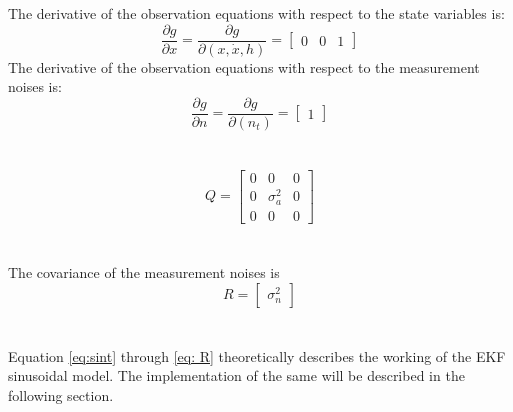 \documentclass[12pt]{article}
\begin{document}
The derivative of the observation equations with respect to the state variables is:
\begin{equation}
\frac{\partial g}{\partial x} =
\frac{\partial g}{\partial (x,\dot{x},h)} =
\begin{bmatrix}
0 & 0 & 1
\end{bmatrix}
\label{eq: Dgx}
\end{equation}
The derivative of the observation equations with respect to the measurement noises is:
\begin{equation}
\frac{\partial g}{\partial n} =
\frac{\partial g}{\partial (n_t)} =
\begin{bmatrix}
1 
\end{bmatrix}
\label{eq: Dgn}
\end{equation} \\
\\
\begin{equation}
Q = \begin{bmatrix}
0 & 0 & 0  \\
0 & \sigma_a^2 & 0  \\
0 & 0 & 0 
\end{bmatrix}
\label{eq: Q}
\end{equation} \\
\\ 
The covariance of the measurement noises is
\begin{equation}
R = \begin{bmatrix}
\sigma_n^2
\end{bmatrix}
\label{eq: R}
\end{equation} \\
\\
Equation \ref{eq:sint} through \ref{eq: R} theoretically describes the working of the EKF sinusoidal model. The implementation of the same will be described in the following section.
\end{document}
